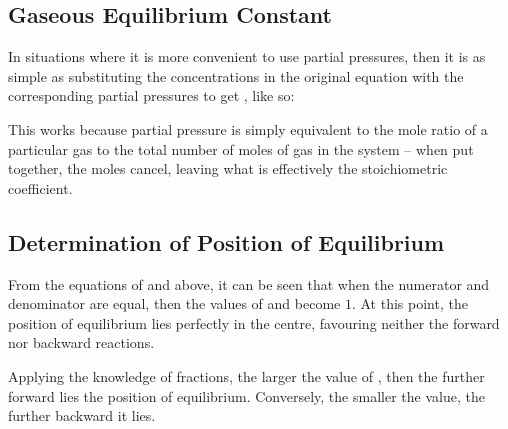 		\subsection{Gaseous Equilibrium Constant \texorpdfstring{\Kp{}}{Kp}}

			In situations where it is more convenient to use partial pressures, then it is as simple as substituting the concentrations
			in the original \Kc{} equation with the corresponding partial pressures to get \Kp{}, like so:

			\mathdiagram{
				\[ \MKp = \frac{(P_{C})^{c}(P_{D})^{d}}{(P_{A})^{a}(P_{B})^{b}} \]
			}

			This works because partial pressure is simply equivalent to the mole ratio of a particular gas to the total number of
			moles of gas in the system -- when put together, the moles cancel, leaving what is effectively the stoichiometric
			coefficient.



		\pagebreak
		\subsection{Determination of Position of Equilibrium}

			From the equations of \Kc{} and \Kp{} above, it can be seen that when the numerator and denominator are equal, then the values of
			\Kc{} and \Kp{} become $1$. At this point, the position of equilibrium lies perfectly in the centre, favouring neither the forward
			nor backward reactions.

			Applying the knowledge of fractions, the larger the value of \Kc{}, then the further forward lies the position of equilibrium.
			Conversely, the smaller the value, the further backward it lies.


